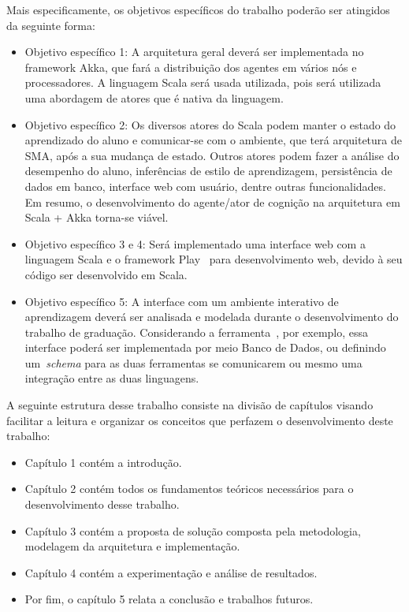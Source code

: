 Mais especificamente, os objetivos específicos do trabalho poderão ser atingidos da seguinte forma:
 \begin{itemize}
	\item Objetivo específico 1: A arquitetura geral deverá ser implementada no framework Akka, que fará a distribuição dos agentes em vários nós e processadores. A linguagem Scala será usada utilizada, pois será utilizada uma abordagem de atores que é nativa da linguagem.
	\item Objetivo específico 2: Os diversos atores do Scala podem manter o estado do aprendizado do aluno e comunicar-se com o ambiente, que terá arquitetura de SMA, após a sua mudança de estado. Outros atores podem fazer a análise do desempenho do aluno, inferências de estilo de aprendizagem, persistência de dados em banco, interface web com usuário, dentre outras funcionalidades. Em resumo, o desenvolvimento do agente/ator de cognição na arquitetura em Scala + Akka torna-se viável.
	\item Objetivo específico 3 e 4: Será implementado uma interface web com a linguagem Scala e o framework Play~\cite{playFramework} para desenvolvimento web, devido à seu código ser desenvolvido em Scala.
	\item Objetivo específico 5: A interface com um ambiente interativo de aprendizagem deverá ser analisada e modelada durante o desenvolvimento do trabalho de graduação. Considerando a ferramenta~\cite{quizWiki}, por exemplo, essa interface poderá ser implementada por meio Banco de Dados, ou definindo um~\emph{schema} para as duas ferramentas se comunicarem ou mesmo uma integração entre as duas linguagens.
\end{itemize}


A seguinte estrutura desse trabalho consiste na divisão de capítulos visando facilitar a leitura e organizar os conceitos que perfazem o desenvolvimento deste trabalho:
\begin{itemize}
	\item Capítulo 1 contém a introdução.
	\item Capítulo 2 contém todos os fundamentos teóricos necessários para o desenvolvimento desse trabalho.
	\item Capítulo 3 contém a proposta de solução composta pela metodologia, modelagem da arquitetura e implementação.
	\item Capítulo 4 contém a experimentação e análise de resultados.
	\item Por fim, o capítulo 5 relata a conclusão e trabalhos futuros.
\end{itemize}
